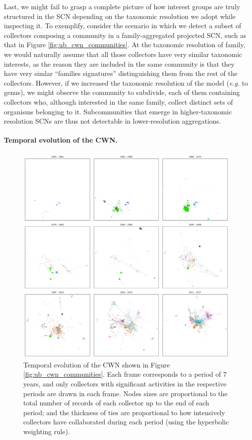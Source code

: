 Last, we might fail to grasp a complete picture of how interest groups are truly structured in the SCN depending on the taxonomic resolution we adopt while inspecting it.
To exemplify, consider the scenario in which we detect a subset of collectors composing a community in a family-aggregated projected SCN, such as that in Figure \ref{fig:ub_cwn_communities}.
At the taxonomic resolution of family, we would naturally assume that all those collectors have very similar taxonomic interests, as the reason they are included in the same community is that they have very simlar ``families signatures'' distinguishing them from the rest of the collectors. 
However, if we increased the taxonomic resolution of the model (\textit{e.g.} to genus), we might observe the community to subdivide, each of them containing collectors who, although interested in the same family, collect distinct sets of organisms belonging to it.
Subcommunities that emerge in higher-taxonomic resolution SCNs are thus not detectable in lower-resolution aggregations.


\paragraph*{Temporal evolution of the CWN.}

\begin{figure}[h!]
  	\centering
    \includegraphics[width=\linewidth]{figures/casestudy_ub/cwn_temporal_evol.png}
    \caption{ Temporal evolution of the CWN shown in Figure \ref{fig:ub_cwn_communities}. Each frame corresponds to a period of $7$ years, and only collectors with significant activities in the respective periods are drawn in each frame. Nodes sizes are proportional to the total number of records of each collector up to the end of each period; and the thickness of ties are proportional to how intensively collectors have collaborated during each period (using the hyperbolic weighting rule). }
    \label{fig:ub_cwn_temporal_evol}
\end{figure}

